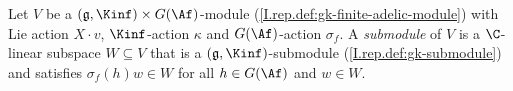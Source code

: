 Let $V$ be a $(\mathfrak g,\Kinf)\times G(\Af)$-module (\cref{I.rep.def:gk-finite-adelic-module}) with Lie action
$X\cdot v$, $\Kinf$-action $\kappa$ and $G(\Af)$-action $\sigma_f$. A \emph{submodule} of $V$ is a $\C$-linear subspace
$W\subseteq V$ that is a $(\mathfrak g,\Kinf)$-submodule (\cref{I.rep.def:gk-submodule}) and satisfies
$\sigma_f(h)w\in W$ for all $h\in G(\Af)$ and $w\in W$.
